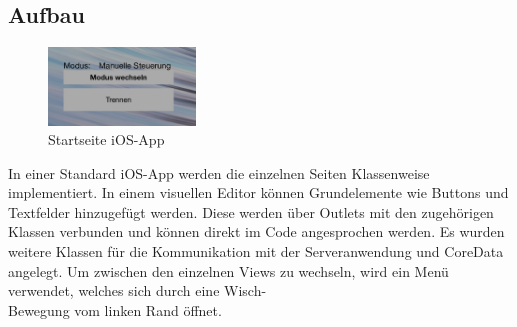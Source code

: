 \subsection{Aufbau}
\begin{figure}
	\vspace{-20pt}
	\begin{center}
		\includegraphics[width=0.35\textwidth]{./data/welcome.png}
	\end{center}
	\vspace{-20pt}
	\caption{\label{fig:welcome-image}Startseite iOS-App}
	\vspace{-10pt}
\end{figure}
In einer Standard iOS-App werden die einzelnen Seiten Klassenweise implementiert. In einem visuellen Editor können Grundelemente wie Buttons und Textfelder hinzugefügt werden. Diese werden über Outlets mit den zugehörigen Klassen verbunden und können direkt im Code angesprochen werden. 
Es wurden weitere Klassen für die Kommunikation mit der Serveranwendung und CoreData angelegt. Um zwischen den einzelnen Views zu wechseln, wird ein Menü verwendet, welches sich durch eine Wisch-\\Bewegung vom linken Rand öffnet. 

